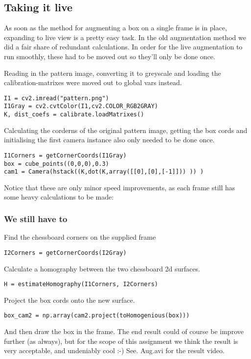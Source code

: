 \subsection{Taking it live}

As soon as the method for augmenting a box on a single frame is in place,
expanding to live view is a pretty easy task. 
In the old augmentation method we did a fair share of redundant
calculations. In order for the live augmentation to run smoothly, these had
to be moved out so they’ll only be done once.

Reading in the pattern image, converting it to greyscale and loading the
calibration-matrixes were moved out to global vars instead.

\begin{verbatim}
I1 = cv2.imread("pattern.png")
I1Gray = cv2.cvtColor(I1,cv2.COLOR_RGB2GRAY)
K, dist_coefs = calibrate.loadMatrixes()
\end{verbatim}

Calculating the corderns of the original pattern image, getting the box cords
and initialising the first camera instance also only needed to be done once.

\begin{verbatim}
I1Corners = getCornerCoords(I1Gray)
box = cube_points((0,0,0),0.3)
cam1 = Camera(hstack((K,dot(K,array([[0],[0],[-1]])) )) )
\end{verbatim}

Notice that these are only minor speed improvements, as each frame still has
some heavy calculations to be made:

\subsubsection{We still have to}
Find the chessboard corners on the supplied frame

\begin{verbatim}
I2Corners = getCornerCoords(I2Gray)
\end{verbatim}

Calculate a homography between the two chessboard 2d surfaces.

\begin{verbatim}
H = estimateHomography(I1Corners, I2Corners)
\end{verbatim}

Project the box cords onto the new surface.

\begin{verbatim}
box_cam2 = np.array(cam2.project(toHomogenious(box)))
\end{verbatim}

And then draw the box in the frame.
The end result could of course be improve further (as always), but for the scope
of this assignment we think the result is very acceptable, and undeniably cool
:-)
See. Aug.avi for the result video.
